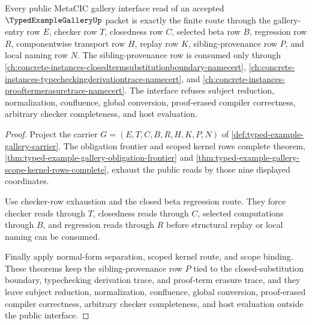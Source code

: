\begin{theorem}
\label{thm:typed-example-gallery-public-interface}
Every public MetaCIC gallery interface read of an accepted $\TypedExampleGalleryUp$ packet is exactly the finite route through the gallery-entry row $E$, checker row $T$, closedness row $C$, selected beta row $B$, regression row $R$, componentwise transport row $H$, replay row $K$, sibling-provenance row $P$, and local naming row $N$. The sibling-provenance row is consumed only through \autoref{ch:concrete-instances-closedtermsubstitutionboundary-namecert}, \autoref{ch:concrete-instances-typecheckingderivationtrace-namecert}, and \autoref{ch:concrete-instances-prooftermerasuretrace-namecert}. The interface refuses subject reduction, normalization, confluence, global conversion, proof-erased compiler correctness, arbitrary checker completeness, and host evaluation.
\end{theorem}
\begin{proof}
Project the carrier $G=(E,T,C,B,R,H,K,P,N)$ of \autoref{def:typed-example-gallery-carrier}. The obligation frontier and scoped kernel rows complete theorem, \autoref{thm:typed-example-gallery-obligation-frontier} and \autoref{thm:typed-example-gallery-scope-kernel-rows-complete}, exhaust the public reads by those nine displayed coordinates.

Use checker-row exhaustion and the closed beta regression route. They force checker reads through $T$, closedness reads through $C$, selected computations through $B$, and regression reads through $R$ before structural replay or local naming can be consumed.

Finally apply normal-form separation, scoped kernel route, and scope binding. These theorems keep the sibling-provenance row $P$ tied to the closed-substitution boundary, typechecking derivation trace, and proof-term erasure trace, and they leave subject reduction, normalization, confluence, global conversion, proof-erased compiler correctness, arbitrary checker completeness, and host evaluation outside the public interface.
\end{proof}


